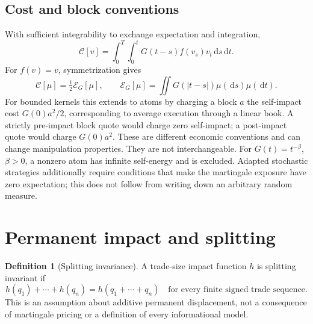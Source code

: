 \documentclass[11pt]{article}
\numberwithin{equation}{section}
\theoremstyle{definition}
\newtheorem{definition}[theorem]{Definition}
\theoremstyle{remark}
\theoremstyle{definition}
\newcommand{\dd}{\,\mathrm d}
\begin{document}
\subsection{Cost and block conventions}
With sufficient integrability to exchange expectation and integration,
\begin{equation}\label{eq:cost}
 \mathcal C[v]=\int_0^T\int_0^t G(t-s)f(v_s)v_t\dd s\dd t.
\end{equation}
For $f(v)=v$, symmetrization gives
\begin{equation}\label{eq:energy}
 \mathcal C[\mu]=\tfrac12\mathcal E_G[\mu],\qquad
 \mathcal E_G[\mu]=\iint G(|t-s|)\mu(\dd s)\mu(\dd t).
\end{equation}
For bounded kernels this extends to atoms by charging a block $a$ the
self-impact cost $G(0)a^2/2$, corresponding to average execution through a
linear book. A strictly pre-impact block quote would charge zero self-impact;
a post-impact quote would charge $G(0)a^2$. These are different economic
conventions and can change manipulation properties. They are not interchangeable.
For $G(t)=t^{-\beta}$, $\beta>0$, a nonzero atom has infinite self-energy and is
excluded. Adapted stochastic strategies additionally require conditions that
make the martingale exposure have zero expectation; this does not follow from
writing down an arbitrary random measure.

\section{Permanent impact and splitting}\label{sec:perm}

\begin{definition}[Splitting invariance]
A trade-size impact function $h$ is splitting invariant if
\begin{equation}\label{eq:splitting}
 h(q_1)+\cdots+h(q_n)=h(q_1+\cdots+q_n)
 \quad\text{for every finite signed trade sequence.}
\end{equation}
This is an assumption about additive permanent displacement, not a consequence
of martingale pricing or a definition of every informational model.
\end{definition}
\end{document}
